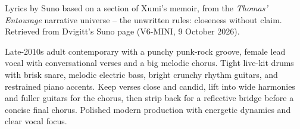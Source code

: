 
\begin{notes}
Lyrics by Suno based on a section of Xumi's memoir, from the \emph{Thomas' Entourage} narrative universe -- the unwritten rules: closeness without claim. Retrieved from Dvigitt's Suno page (V6-MINI, 9 October 2026).
\end{notes}
\begin{style}
Late-2010s adult contemporary with a punchy punk-rock groove, female lead vocal with conversational verses and a big melodic chorus. Tight live-kit drums with brisk snare, melodic electric bass, bright crunchy rhythm guitars, and restrained piano accents. Keep verses close and candid, lift into wide harmonies and fuller guitars for the chorus, then strip back for a reflective bridge before a concise final chorus. Polished modern production with energetic dynamics and clear vocal focus.
\end{style}
